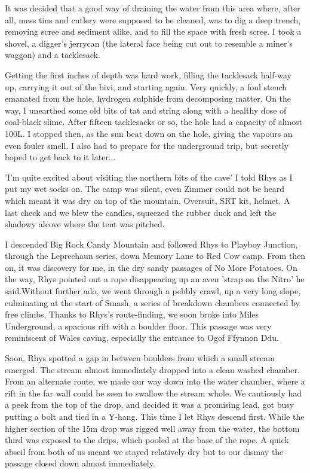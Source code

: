 \documentclass[onecolumn]{book}
\begin{document}
It was decided that a good way of draining the water from this area where, after all, mess tins and cutlery were supposed to be cleaned, was to dig a deep trench, removing scree and sediment alike, and to fill the space with fresh scree. I took a shovel, a digger's jerrycan (the lateral face being cut out to resemble a miner's waggon) and a tacklesack. 

Getting the first inches of depth was hard work, filling the tacklesack half-way up, carrying it out of the bivi, and starting again. Very quickly, a foul stench emanated from the hole, hydrogen sulphide from decomposing matter. On the way, I unearthed some old bits of tat and string along with a healthy dose of coal-black slime. After fifteen tacklesacks or so, the hole had a capacity of almost 100L. I stopped then, as the sun beat down on the hole, giving the vapours an even fouler smell. I also had to prepare for the underground trip, but secretly hoped to get back to it later...


'I'm quite excited about visiting the northern bits of the cave' I told Rhys as I put my wet socks on. The camp was silent, even Zimmer could not be heard which meant it was dry on top of the mountain. Oversuit, SRT kit, helmet. A last check and we blew the candles, squeezed the rubber duck and left the shadowy alcove where the tent was pitched.

I descended Big Rock Candy Mountain and followed Rhys to Playboy Junction, through the Leprechaun series, down Memory Lane to Red Cow camp. From then on, it was discovery for me, in the dry sandy passages of No More Potatoes. On the way, Rhys pointed out a rope disappearing up an aven 'strap on the Nitro' he said.Without further ado, we went through a pebbly crawl, up a very long slope, culminating at the start of Smash, a series of breakdown chambers connected by free climbs. Thanks to Rhys's route-finding, we soon broke into Miles Underground, a spacious rift with a boulder floor. This passage was very reminiscent of Wales caving, especially the entrance to Ogof Ffynnon Ddu. 

Soon, Rhys spotted a gap in between boulders from which a small stream emerged. The stream almost immediately dropped into a clean washed chamber. From an alternate route, we made our way down into the water chamber, where a rift in the far wall could be seen to swallow the stream whole. We cautiously had a peek from the top of the drop, and decided it was a promising lead, got busy putting a bolt and tied in a Y-hang. This time I let Rhys descend first. While the higher section of the 15m drop was rigged well away from the water, the bottom third was exposed to the drips, which pooled at the base of the rope. A quick abseil from both of us meant we stayed relatively dry but to our dismay the passage closed down almost immediately. 
\end{document}
